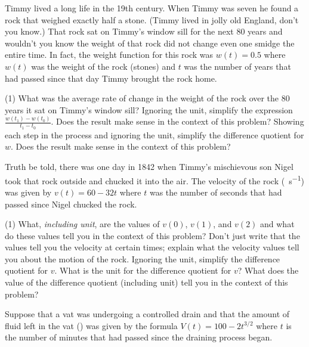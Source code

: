 \documentclass[12pt,]{book}
\theoremstyle{plain}
\theoremstyle{definition}
\numberwithin{equation}{section}
\newcommand{\fe}[2]{#1\mathopen{}\left(#2\right)\mathclose{}}
\begin{document}
Timmy lived a long life in the 19th century. When Timmy was seven he found a rock that weighed exactly half a stone. (Timmy lived in jolly old England, don't you know.) That rock sat on Timmy's window sill for the next 80 years and wouldn't you know the weight of that rock did not change even one smidge the entire time. In fact, the weight function for this rock was \(\fe{w}{t}=0.5\) where \(\fe{w}{t}\) was the weight of the rock (stones) and \(t\) was the number of years that had passed since that day Timmy brought the rock home.%
\par
\begin{exercisegroup}(1)
\exercise[12.]\hypertarget{exercise-20}{\null}What was the average rate of change in the weight of the rock over the 80 years it sat on Timmy's window sill?%
\exercise[13.]\hypertarget{exercise-21}{\null}Ignoring the unit, simplify the expression \(\frac{\fe{w}{t_1}-\fe{w}{t_0}}{t_1-t_0}\). Does the result make sense in the context of this problem?%
\exercise[14.]\hypertarget{exercise-22}{\null}Showing each step in the process and ignoring the unit, simplify the difference quotient for \(w\). Does the result make sense in the context of this problem?%
\end{exercisegroup}
\par\smallskip\noindent
Truth be told, there was one day in 1842 when Timmy's mischievous son Nigel took that rock outside and chucked it into the air. The velocity of the rock (\si{\foot\per\second}) was given by \(\fe{v}{t}=60-32t\) where \(t\) was the number of seconds that had passed since Nigel chucked the rock.%
\par
\begin{exercisegroup}(1)
\exercise[15.]\hypertarget{exercise-23}{\null}What, \emph{including unit}, are the values of \(\fe{v}{0}\), \(\fe{v}{1}\), and \(\fe{v}{2}\) and what do these values tell you in the context of this problem? Don't just write that the values tell you the velocity at certain times; explain what the velocity values tell you about the motion of the rock.%
\exercise[16.]\hypertarget{exercise-24}{\null}Ignoring the unit, simplify the difference quotient for \(v\).%
\exercise[17.]\hypertarget{exercise-25}{\null}What is the unit for the difference quotient for \(v\)? What does the value of the difference quotient (including unit) tell you in the context of this problem?%
\end{exercisegroup}
\par\smallskip\noindent
Suppose that a vat was undergoing a controlled drain and that the amount of fluid left in the vat (\si{\gallon}) was given by the formula \(\fe{V}{t}=100-2t^{3/2}\) where \(t\) is the number of minutes that had passed since the draining process began.%
\end{document}
